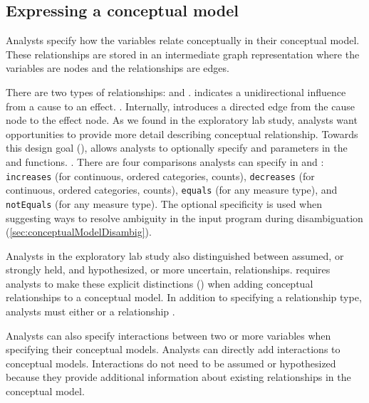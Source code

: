 \subsection{Expressing a conceptual model}
Analysts specify how the variables relate conceptually in their conceptual
model. These relationships are stored in an intermediate graph representation
where the variables are nodes and the relationships are edges. 

There are two types of relationships: \causes and \relates. \causes indicates a
unidirectional influence from a cause to an effect. . Internally,
\causes introduces a directed edge from the cause node to the effect node. As we
found in the exploratory lab study, analysts want opportunities to provide more
detail describing conceptual relationship. Towards this design goal
(\optionalSpecificity), \rTisane allows analysts to optionally specify \when and
\then parameters in the \causes and \relates functions. . There are
four comparisons analysts can specify in \when and \then: \texttt{increases}
(for continuous, ordered categories, counts), \texttt{decreases} (for
continuous, ordered categories, counts), \texttt{equals} (for any measure type),
and \texttt{notEquals} (for any measure type). The optional specificity is used
when suggesting ways to resolve ambiguity in the input program during
disambiguation (\autoref{sec:conceptualModelDisambig}).

Analysts in the exploratory lab study also distinguished between assumed, or
strongly held, and hypothesized, or more uncertain, relationships. \rTisane
requires analysts to make these explicit distinctions (\assumeHypothesize) when
adding conceptual relationships to a conceptual model. In addition to specifying
a relationship type, analysts must either \assume or \hypothesize a relationship
.


Analysts can also specify interactions between two or more variables when
specifying their conceptual models. %
Analysts can directly add interactions to conceptual models. Interactions do not
need to be assumed or hypothesized because they provide additional information
about existing relationships in the conceptual model. 


